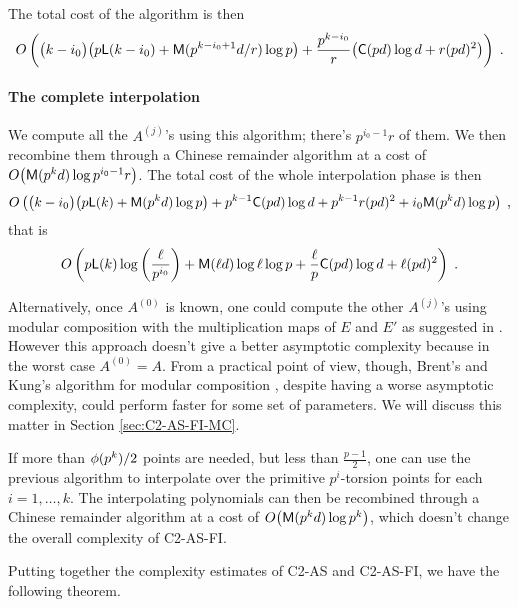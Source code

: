 The total cost of the algorithm is then
\begin{equation*}
  \label{eq:T:complexity}
  O\left(\bigl(k-i_0\bigr)\bigl(p{\sf L}(k-i_0) + \mathrm{\sf M}(p^{k-i_0+1}d/r)\log p\bigr) +
    \frac{p^{k-i_0}}{r}\bigl(\mathrm{\sf C}(pd)\log d + r(pd)^2\bigr) \right)
  \;\text{.}
\end{equation*}


\paragraph{The complete interpolation}
We compute all the $A^{(j)}$'s using this algorithm; there's
$p^{i_0-1}r$ of them. We then recombine them through a Chinese
remainder algorithm at a cost of $O\bigl(\mathrm{\sf M}(p^kd)\log
p^{i_0-1}r\bigr)$. The total cost of the whole interpolation phase is
then
\begin{equation*}
  O\left(\bigl(k-i_0\bigr) \bigl(p{\sf L}(k) + \mathrm{\sf M}(p^kd)\log p\bigr) +
    p^{k-1}\mathrm{\sf C}(pd)\log d + p^{k-1}r(pd)^2 + i_0\mathrm{\sf M}(p^kd)\log p
  \right)
  \;\text{,}
\end{equation*}
that is
\begin{equation}
  \label{eq:interp}
  O\left(p{\sf L}(k)\log\left(\frac{\ell}{p^{i_0}}\right) + 
    \mathrm{\sf M}(\ell d)\log\ell\log p +
    \frac{\ell}{p}\mathrm{\sf C}(pd)\log d +
    \ell (pd)^2
  \right)
  \;\text{.}
\end{equation}

Alternatively, once $A^{(0)}$ is known, one could compute the other
$A^{(j)}$'s using modular composition with the multiplication maps
of $E$ and $E'$ as suggested in \cite{Cou96}. However this approach
doesn't give a better asymptotic complexity because in the worst case
$A^{(0)}=A$. From a practical point of view, though, Brent's and
Kung's algorithm for modular composition \cite{BrKu78}, despite having
a worse asymptotic complexity, could perform faster for some set of
parameters. We will discuss this matter in Section
\ref{sec:C2-AS-FI-MC}.

If more than $\phi(p^k)/2$ points are needed, but less than
$\frac{p-1}{2}$, one can use the previous algorithm to interpolate
over the primitive $p^i$-torsion points for each $i=1,\ldots,k$. The
interpolating polynomials can then be recombined through a Chinese
remainder algorithm at a cost of $O\bigl(\mathrm{\sf M}(p^kd)\log p^k\bigr)$,
which doesn't change the overall complexity of C2-AS-FI.


Putting together the complexity estimates of C2-AS and C2-AS-FI, we
have the following theorem.

